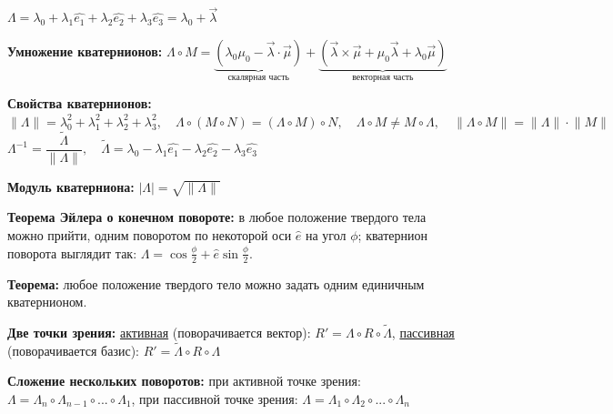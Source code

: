 \begin{itemize*}
  \item \(\Lambda = \lambda_0 + \lambda_1\hat{e_1} + \lambda_2\hat{e_2} + \lambda_3\hat{e_3} =
  \lambda_0 + \vec{\lambda}\) \\

  \item \textbf{Умножение кватернионов:} \(\Lambda \circ M = \underbrace{(\lambda_0\mu_0 -
  \vec{\lambda} \cdot \vec{\mu})}_\text{скалярная часть} + \underbrace{(\vec{\lambda} \times
  \vec{\mu} + \mu_0\vec{\lambda} + \lambda_0\vec{\mu})}_\text{векторная часть}\) \\

  \item \textbf{Свойства кватернионов:} \(\lVert\Lambda\rVert = \lambda_0^2 + \lambda_1^2
  + \lambda_2^2 + \lambda_3^2, \quad \Lambda \circ (M \circ N) = (\Lambda \circ M) \circ N,
  \quad \Lambda \circ M \neq M \circ \Lambda, \quad \lVert \Lambda \circ M \rVert = \lVert
  \Lambda \rVert \cdot \lVert M \rVert\) \\
  \(\Lambda^{-1} = \dfrac{\tilde{\Lambda}}{\lVert \Lambda \rVert}, \quad \tilde{\Lambda} =
  \lambda_0 - \lambda_1\hat{e_1} - \lambda_2\hat{e_2} - \lambda_3\hat{e_3}\) \\

  \item \textbf{Модуль кватерниона:} \(|\Lambda| = \sqrt{\lVert \Lambda \rVert}\) \\

  \item \textbf{Теорема Эйлера о конечном повороте:} в любое положение твердого тела можно прийти,
  одним поворотом по некоторой оси \(\hat{e}\) на угол \(\phi\); кватернион поворота выглядит так:
  \(\Lambda = \cos{\frac{\phi}{2} + \hat{e}\sin{\frac{\phi}{2}}}\). \\

  \item \textbf{Теорема:} любое положение твердого тело можно задать одним единичным кватернионом.
  \\

  \item \textbf{Две точки зрения:} \underline{активная} (поворачивается вектор): \(R' =
  \Lambda \circ R \circ \tilde{\Lambda}\),  \underline{пассивная} (поворачивается базис): \(R' =
  \tilde{\Lambda} \circ R \circ \Lambda\)

  \item \textbf{Сложение нескольких поворотов:} при активной точке зрения: \(\Lambda = \Lambda_n
  \circ \Lambda_{n-1} \circ ... \circ \Lambda_1\), при пассивной точке зрения: \(\Lambda = \Lambda_1
  \circ \Lambda_2 \circ ... \circ \Lambda_n\)

\end{itemize*}


